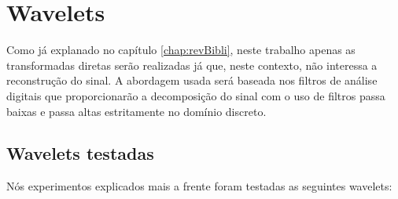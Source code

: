 	\section{Wavelets}
		\par Como já explanado no capítulo \ref{chap:revBibli}, neste trabalho apenas as transformadas diretas serão realizadas já que, neste contexto, não interessa a reconstrução do sinal. A abordagem usada será baseada nos filtros de análise digitais que proporcionarão a decomposição do sinal com o uso de filtros passa baixas e passa altas estritamente no domínio discreto.

		\subsection{Wavelets testadas}
			\par Nós experimentos explicados mais a  frente foram testadas as seguintes wavelets:
